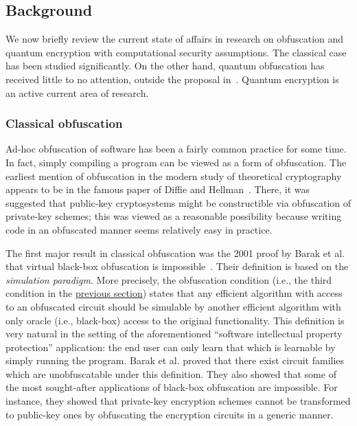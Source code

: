 \documentclass[envcountsame]{llncs}
\numberwithin{equation}{section}
\newcommand{\expreft}[2]{\texorpdfstring{\hyperref[#2]{#1}}{#1}}
\begin{document}
\subsection{Background}

We now briefly review the current state of affairs in research on obfuscation and quantum encryption with computational security assumptions. The classical case has been studied significantly. On the other hand, quantum obfuscation has received little to no attention, outside the proposal in~\cite{AJJ14}. Quantum encryption is an active current area of research.

\subsubsection{Classical obfuscation} 

Ad-hoc obfuscation of software has been a fairly common practice for some time. In fact, simply compiling a program can be viewed as a form of obfuscation.  The earliest mention of obfuscation in the modern study of theoretical cryptography appears to be in the famous paper of Diffie and Hellman~\cite{DH76}. There, it was suggested that public-key cryptosystems might be constructible via obfuscation of private-key schemes; this was viewed as a reasonable possibility because writing code in an obfuscated manner seems relatively easy in practice. 

The first major result in classical obfuscation was the 2001 proof by Barak et al. that virtual black-box obfuscation is impossible~\cite{BGIRSVY01, BGIRSVY12}. Their definition is based on the \emph{simulation paradigm}. More precisely, the obfuscation condition (i.e., the third condition in the \expreft{previous section}{def:obf-informal}) states that any efficient algorithm with access to an obfuscated circuit should be simulable by another efficient algorithm with only oracle (i.e., black-box) access to the original functionality. This definition is very natural in the setting of the aforementioned ``software intellectual property protection'' application: the end user can only learn that which is learnable by simply running the program. Barak et al. proved that  there exist circuit families which are unobfuscatable under this definition. They also showed that some of the most sought-after applications of black-box obfuscation are impossible. For instance, they showed that private-key encryption schemes cannot be transformed to public-key ones by obfuscating the encryption circuits in a generic manner.
\end{document}
